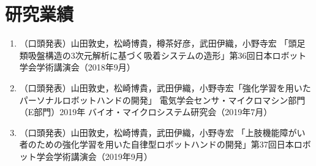 \chapter{研究業績}

\begin{enumerate}
    
    \item （口頭発表）山田敦史，松崎博貴，樽茶好彦，武田伊織，小野寺宏 「頭足類吸盤構造の3次元解析に基づく吸着システムの造形」第36回日本ロボット学会学術講演会（2018年9月）
    \item （口頭発表）山田敦史，松崎博貴，武田伊織，小野寺宏「強化学習を用いたパーソナルロボットハンドの開発」 電気学会センサ・マイクロマシン部門（E部門）2019年 バイオ・マイクロシステム研究会（2019年7月）
    \item （口頭発表）山田敦史，松崎博貴，武田伊織，小野寺宏 「上肢機能障がい者のための強化学習を用いた自律型ロボットハンドの開発」第37回日本ロボット学会学術講演会（2019年9月）
    
\end{enumerate}